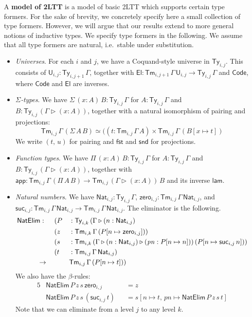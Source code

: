 \documentclass[acmsmall]{acmart}
\newcommand{\mit}[1]{\mathit{#1}}
\newcommand{\msf}[1]{\mathsf{#1}}
\newcommand{\ext}{\triangleright}
\newcommand{\Code}{\msf{Code}}
\newcommand{\El}{\msf{El}}
\newcommand{\lam}{\msf{lam}}
\newcommand{\app}{\msf{app}}
\newcommand{\NatElim}{\msf{NatElim}}
\renewcommand{\U}{\msf{U}}
\newcommand{\Ty}{\msf{Ty}}
\newcommand{\Tm}{\msf{Tm}}
\newcommand{\Nat}{\msf{Nat}}
\newcommand{\zero}{\msf{zero}}
\newcommand{\suc}{\msf{suc}}
\newcommand{\fst}{\msf{fst}}
\newcommand{\snd}{\msf{snd}}
\theoremstyle{remark}
\begin{document}
\begin{definition} A \textbf{model of 2LTT} is a model of basic 2LTT
which supports certain type formers. For the sake of brevity, we concretely
specify here a small collection of type formers. However, we will argue that our
results extend to more general notions of inductive types. We specify type
formers in the following. We assume that all type formers are natural,
i.e.\ stable under substitution.
\begin{itemize}
\item \emph{Universes}. For each $i$ and $j$, we have a Coquand-style universe
  \cite{coquand2018canonicity} in $\Ty_{i,j}$. This consists of $\U_{i,j} : \Ty_{i,j+1}\,\Gamma$,
  together with $\El : \Tm_{i,j+1}\,\Gamma\,\U_{i,j} \to \Ty_{i,j}\,\Gamma$ and $\Code$, where $\Code$
  and $\El$ are inverses.
\item \emph{$\Sigma$-types}. We have $\Sigma\,(x : A)\,B : \Ty_{i,j}\,\Gamma$ for $A : \Ty_{i,j}\,\Gamma$
  and $B : \Ty_{i,j}\,(\Gamma \ext (x : A))$, together with a natural isomorphism of pairing and projections:
  \[ \Tm_{i,j}\,\Gamma\,(\Sigma\,A\,B) \simeq ((t : \Tm_{i,j}\,\Gamma\,A) \times \Tm_{i,j}\,\Gamma\,(B[x\mapsto t]) \]
  We write $(t,\,u)$ for pairing and $\fst$ and $\snd$ for projections.
\item \emph{Function types}. We have $\Pi\,(x : A)\,B : \Ty_{i,j}\,\Gamma$ for $A :
  \Ty_{i,j}\,\Gamma$ and $B : \Ty_{i,j}\,(\Gamma \ext (x : A))$, together with
  $\app : \Tm_{i,j}\,\Gamma\,(\Pi\,A\,B) \to \Tm_{i,j}\,(\Gamma \ext (x :
  A))\,B$ and its inverse $\lam$.
\item \emph{Natural numbers}. We have $\Nat_{i,j} : \Ty_{i,j}\,\Gamma$, $\zero_{i,j} : \Tm_{i,j}\,\Gamma\,\Nat_{i,j}$,
  and $\suc_{i,j} : \Tm_{i,j}\,\Gamma\,\Nat_{i,j} \to \Tm_{i,j}\,\Gamma\,\Nat_{i,j}$. The eliminator is the following.
  \begin{alignat*}{5}
    & \NatElim :\hspace{0.5em}
                &&  (P &&: \Ty_{i,k}\,(\Gamma \ext (n : \Nat_{i,j}) \\
    &           &&  (z &&: \Tm_{i,k}\,\Gamma\,(P[n\mapsto \zero_{i,j}])) \\
    &           &&  (s &&: \Tm_{i,k}\,(\Gamma \ext (n : \Nat_{i,j}) \ext (\mit{pn} : P[n\mapsto n]))\,(P[n\mapsto \suc_{i,j}\,n]))\\
    &           &&  (t &&: \Tm_{i,j}\,\Gamma\,\Nat_{i,j}) \\
    &\hspace{3em}\to        &&&& \Tm_{i,j}\,\Gamma\,(P[n\mapsto t]))
  \end{alignat*}
  We also have the $\beta$-rules:
  \begin{alignat*}{5}
    & \NatElim\,P\,z\,s\,\zero_{i,j}     &&= z \\
    & \NatElim\,P\,z\,s\,(\suc_{i,j}\,t) &&= s[n \mapsto t,\,\mit{pn} \mapsto \NatElim\,P\,z\,s\,t]
  \end{alignat*}
  Note that we can eliminate from a level $j$ to any level $k$.
\end{itemize}
\end{definition}
\end{document}
